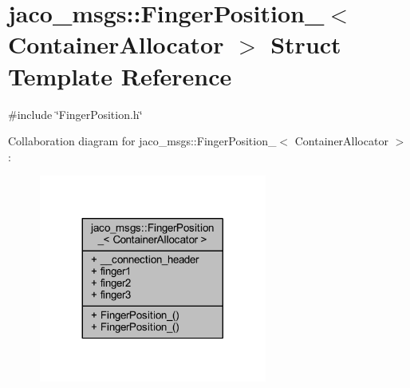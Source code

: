 \hypertarget{structjaco__msgs_1_1FingerPosition__}{}\section{jaco\+\_\+msgs\+:\+:Finger\+Position\+\_\+$<$ Container\+Allocator $>$ Struct Template Reference}
\label{structjaco__msgs_1_1FingerPosition__}


{\ttfamily \#include \char`\"{}Finger\+Position.\+h\char`\"{}}



Collaboration diagram for jaco\+\_\+msgs\+:\+:Finger\+Position\+\_\+$<$ Container\+Allocator $>$\+:
\nopagebreak
\begin{figure}[H]
\begin{center}
\leavevmode
\includegraphics[width=212pt]{de/d2c/structjaco__msgs_1_1FingerPosition____coll__graph}
\end{center}
\end{figure}
